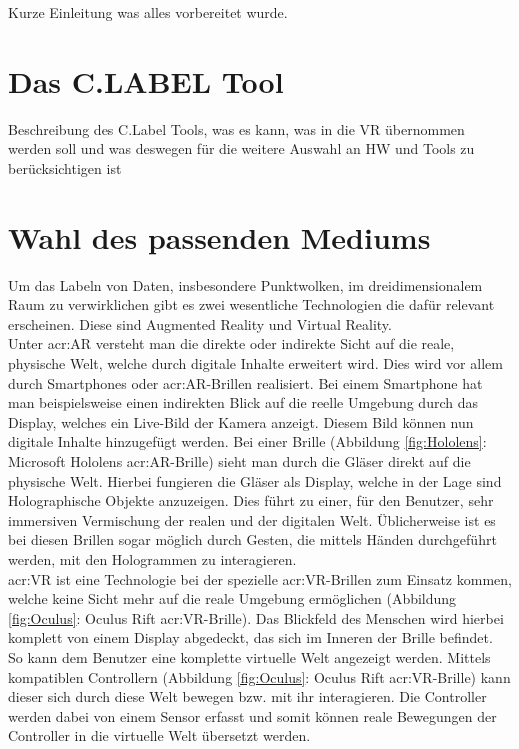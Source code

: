 \graphicspath{{Kapitel/Kapitel_Vorbereitungen/Images/}}

Kurze Einleitung was alles vorbereitet wurde.

\section{Das C.LABEL Tool}
\label{C.LABEL}
Beschreibung des C.Label Tools, was es kann, was in die VR übernommen werden soll und was deswegen für die weitere Auswahl an HW und Tools zu berücksichtigen ist

\section{Wahl des passenden Mediums} 
Um das Labeln von Daten, insbesondere Punktwolken, im dreidimensionalem Raum zu verwirklichen gibt es zwei wesentliche Technologien die dafür relevant erscheinen. Diese sind Augmented Reality und Virtual Reality.\\

Unter \acrfull{acr:AR} versteht man die direkte oder indirekte Sicht auf die reale, physische Welt, welche durch digitale Inhalte erweitert wird. Dies wird vor allem durch Smartphones oder \acrshort{acr:AR}-Brillen realisiert. Bei einem Smartphone hat man beispielsweise einen indirekten Blick auf die reelle Umgebung durch das Display, welches ein Live-Bild der Kamera anzeigt. Diesem Bild können nun digitale Inhalte hinzugefügt werden. Bei einer Brille (Abbildung \ref{fig:Hololens}: Microsoft Hololens \acrshort{acr:AR}-Brille) sieht man durch die Gläser direkt auf die physische Welt. Hierbei fungieren die Gläser als Display, welche in der Lage sind Holographische Objekte anzuzeigen. Dies führt zu einer, für den Benutzer, sehr immersiven Vermischung der realen und der digitalen Welt. Üblicherweise ist es bei diesen Brillen sogar möglich durch Gesten, die mittels Händen durchgeführt werden, mit den Hologrammen zu interagieren.\\

\acrfull{acr:VR} ist eine Technologie bei der spezielle \acrshort{acr:VR}-Brillen zum Einsatz kommen, welche keine Sicht mehr auf die reale Umgebung ermöglichen (Abbildung \ref{fig:Oculus}: Oculus Rift \acrshort{acr:VR}-Brille). Das Blickfeld des Menschen wird hierbei komplett von einem Display abgedeckt, das sich im Inneren der Brille befindet. So kann dem Benutzer eine komplette virtuelle Welt angezeigt werden. Mittels kompatiblen Controllern (Abbildung \ref{fig:Oculus}: Oculus Rift \acrshort{acr:VR}-Brille) kann dieser sich durch diese Welt bewegen bzw. mit ihr interagieren. Die Controller werden dabei von einem Sensor erfasst und somit können reale Bewegungen der Controller in die virtuelle Welt übersetzt werden.\\

